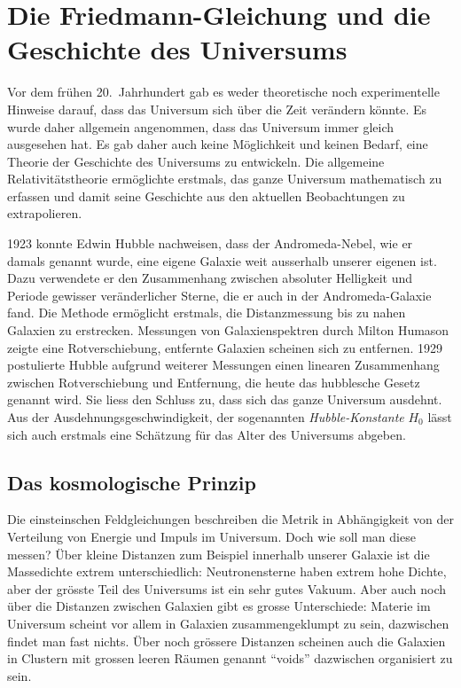 %
%
\section{Die Friedmann-Gleichung und die Geschichte des Universums
\label{buch:kruemmung:section:friedmann}}
Vor dem frühen 20.~Jahrhundert gab es weder theoretische noch experimentelle
Hinweise darauf, dass das Universum sich über die Zeit verändern könnte.
Es wurde daher allgemein angenommen, dass das Universum immer gleich
ausgesehen hat.
Es gab daher auch keine Möglichkeit und keinen Bedarf, eine Theorie der
Geschichte des Universums zu entwickeln.
Die allgemeine Relativitätstheorie ermöglichte erstmals, das ganze
Universum mathematisch zu erfassen und damit seine Geschichte aus
den aktuellen Beobachtungen zu extrapolieren.

1923 konnte Edwin Hubble nachweisen, dass der Andromeda-Nebel, wie
%
er damals genannt wurde, eine eigene Galaxie weit ausserhalb unserer
eigenen ist.
Dazu verwendete er den Zusammenhang zwischen absoluter Helligkeit
und Periode gewisser veränderlicher Sterne, die er auch in der
Andromeda-Galaxie fand.
%
Die Methode ermöglicht erstmals, die Distanzmessung bis zu nahen Galaxien
zu erstrecken.
Messungen von Galaxienspektren durch Milton Humason 
%
zeigte eine Rotverschiebung, entfernte Galaxien scheinen sich zu
%
entfernen.
1929 postulierte Hubble aufgrund weiterer Messungen einen linearen
Zusammenhang zwischen Rotverschiebung und Entfernung, die heute
das hubblesche Gesetz genannt wird.
%
%
Sie liess den Schluss zu, dass sich das ganze Universum ausdehnt.
Aus der Ausdehnungsgeschwindigkeit, der sogenannten 
\emph{Hubble-Konstante} $H_0$
%
lässt sich auch erstmals eine Schätzung für das Alter des Universums
abgeben.

%
%
\subsection{Das kosmologische Prinzip}
Die einsteinschen Feldgleichungen beschreiben die Metrik in Abhängigkeit
von der Verteilung von Energie und Impuls im Universum.
Doch wie soll man diese messen?
Über kleine Distanzen zum Beispiel innerhalb unserer Galaxie ist die
Massedichte extrem unterschiedlich:
Neutronensterne haben extrem hohe Dichte, aber der grösste Teil des
Universums ist ein sehr gutes Vakuum.
Aber auch noch über die Distanzen zwischen Galaxien gibt es grosse
Unterschiede: Materie im Universum scheint vor allem in Galaxien
zusammengeklumpt zu sein, dazwischen findet man fast nichts.
Über noch grössere Distanzen scheinen auch die Galaxien in Clustern
mit grossen leeren Räumen genannt ``voids'' dazwischen organisiert
zu sein.

